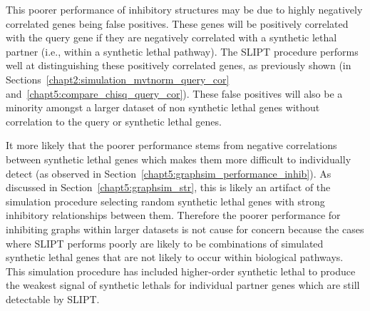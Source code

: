This poorer performance of inhibitory  structures may be due to highly negatively correlated genes being false positives. These genes will be positively correlated with the query gene if they are negatively correlated with a \gls{synthetic lethal} partner (i.e., within a \gls{synthetic lethal} pathway). The \gls{SLIPT} procedure performs well at distinguishing these positively correlated genes, as previously shown (in Sections~\ref{chapt2:simulation_mvtnorm_query_cor} and~\ref{chapt5:compare_chisq_query_cor}). These false positives will also be a minority amongst a larger dataset of non synthetic lethal genes without correlation to the query or \gls{synthetic lethal} genes.

It more likely that the poorer performance stems from negative correlations between \gls{synthetic lethal} genes which makes them more difficult to individually detect (as observed in Section~\ref{chapt5:graphsim_performance_inhib}). As discussed in Section~\ref{chapt5:graphsim_str}, this is likely an artifact of the simulation procedure selecting random \gls{synthetic lethal} genes with strong inhibitory relationships between them. Therefore the poorer performance for inhibiting \glspl{graph} within larger datasets is not cause for concern because the cases where \gls{SLIPT} performs poorly are likely to be combinations of simulated \gls{synthetic lethal} genes that are not likely to occur within biological pathways. This simulation procedure has included higher-order \gls{synthetic lethal} to produce the weakest signal of \glspl{synthetic lethal} for individual partner genes which are still detectable by \gls{SLIPT}.



\FloatBarrier

